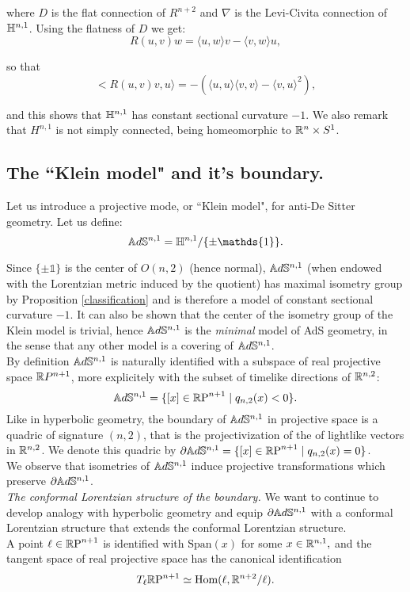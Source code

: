 where $D$ is the flat connection of $R^{n+2}$ and $\nabla$ is the Levi-Civita connection of $\mathbb{H}^{n,1}$. Using the flatness of $D$ we get: 
\[
    R(u,v)w=\langle u,w\rangle v-\langle v,w\rangle u,
\]

so that 
\[
    <R(u,v)v,u\rangle =-(\langle u,u\rangle\langle v,v\rangle-\langle v,u\rangle^2), 
\]

and this shows that $\mathbb{H}^{n,1}$ has constant sectional curvature $-1$. We also remark that $H^{n,1}$ is not simply connected, being homeomorphic to $\mathbb{R}^{n}\times S^1$. 

\subsection{The ``Klein model" and it's boundary.}
Let us introduce a projective mode, or ``Klein model", for anti-De Sitter geometry. Let us define: 
\[
    \A^{n,1}=\H^{n,1}/\{\pm \mathds{1}\}.
\]

Since $\{\pm \mathds{1}\}$ is the center of $O(n,2)$ (hence normal), $\mathbb{A}d\mathbb{S}^{n,1}$ (when endowed with the Lorentzian metric induced by the quotient) has maximal isometry group by Proposition \ref{classification} and is therefore a model of constant sectional curvature $-1$. It can also be shown that the center of the isometry group of the Klein model is trivial, hence $\mathbb{A}d\mathbb{S}^{n,1}$ is the \textit{minimal} model of AdS geometry, in the sense that any other model is a covering of $\mathbb{A}d\mathbb{S}^{n,1}$.\\
By definition $\mathbb{A}d\mathbb{S}^{n,1}$ is naturally identified with a subspace of real projective space $\mathbb{R} P^{n+1}$, more explicitely with the subset of timelike directions of $\mathbb{R}^{n,2}$: 
\[
    \mathbb{A}d\mathbb{S}^{n,1}=\{[x]\in \mathbb{R} \text{P}^{n+1}\;|\;q_{n,2}(x)<0\}.
\]
Like in hyperbolic geometry, the boundary of $\mathbb{A}d\mathbb{S}^{n,1}$ in projective space is a quadric of signature $(n,2)$, that is the projectivization of the of lightlike vectors in $\mathbb{R}^{n,2}$. We denote this quadric by $\partial \mathbb{A}d\mathbb{S}^{n,1}=\{[x]\in \mathbb{R} \text{P}^{n+1}\;|\;q_{n,2}(x)=0\}$.\\ We observe that isometries of $\mathbb{A}d\mathbb{S}^{n,1}$ induce projective transformations which preserve $\partial \mathbb{A}d\mathbb{S}^{n,1}$.  \\

\textit{The conformal Lorentzian structure of the boundary.}
We want to continue to develop analogy with hyperbolic geometry and equip $\partial \mathbb{A}d\mathbb{S}^{n,1}$ with a conformal Lorentzian structure that extends the conformal Lorentzian structure. \\
A point $\ell \in\mathbb{R}\text{P}^{n+1}$ is identified with $\text{Span}(x)$ for some $x\in \mathbb{R}^{n,1},$ and the tangent space of real projective space has the canonical identification 
\[
    T_{\ell}\mathbb{R}\text{P}^{n+1}\simeq \text{Hom}(\ell,\mathbb{R}^{n+2}/\ell). 
\]

